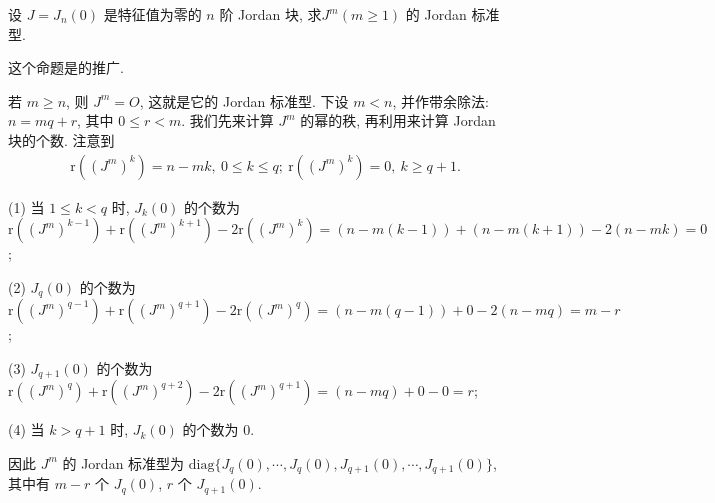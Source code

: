 \documentclass[../../main.tex]{subfiles}
\begin{document}
\begin{proposition}\label{proposition:J_n(0)的Jordan标准型的推广}
设 $J = J_n(0)$ 是特征值为零的 $n$ 阶 Jordan 块, 求$J^m (m \geqslant  1)$ 的 Jordan 标准型.
\end{proposition}
\begin{remark}
这个命题是的推广.
\end{remark}
\begin{solution}
若 $m \geqslant  n$, 则 $J^m = O$, 这就是它的 Jordan 标准型. 下设 $m < n$, 并作带余除法: $n = mq + r$, 其中 $0 \leqslant  r < m$. 我们先来计算 $J^m$ 的幂的秩, 再利用来计算 Jordan 块的个数. 注意到
\begin{align*}
&\mathrm{r}((J^m)^k) = n - mk, \ 0 \leqslant  k \leqslant  q; \ 
\mathrm{r}((J^m)^k) = 0, \ k \geqslant  q + 1.
\end{align*}

(1) 当 $1 \leqslant  k < q$ 时, $J_k(0)$ 的个数为 $\mathrm{r}((J^m)^{k - 1}) + \mathrm{r}((J^m)^{k + 1}) - 2\mathrm{r}((J^m)^k) = (n - m(k - 1)) + (n - m(k + 1)) - 2(n - mk) = 0$;

(2) $J_q(0)$ 的个数为 $\mathrm{r}((J^m)^{q - 1}) + \mathrm{r}((J^m)^{q + 1}) - 2\mathrm{r}((J^m)^q) = (n - m(q - 1)) + 0 - 2(n - mq) = m - r$;

(3) $J_{q + 1}(0)$ 的个数为 $\mathrm{r}((J^m)^q) + \mathrm{r}((J^m)^{q + 2}) - 2\mathrm{r}((J^m)^{q + 1}) = (n - mq) + 0 - 0 = r$;

(4) 当 $k > q + 1$ 时, $J_k(0)$ 的个数为 $0$.

因此 $J^m$ 的 Jordan 标准型为 $\mathrm{diag}\{J_q(0),\cdots,J_q(0),J_{q + 1}(0),\cdots,J_{q + 1}(0)\}$, 其中有 $m - r$ 个 $J_q(0)$, $r$ 个 $J_{q + 1}(0)$. 

\end{solution}
\end{document}
